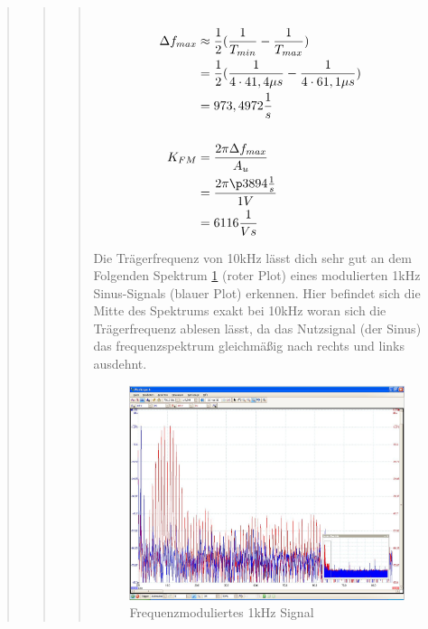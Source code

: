 \begin{quote}
\begin{quote}
\begin{quote}
            
            \begin{equation*}
            \begin{split}
            \\
                \Delta f_{max} &\approx \frac{1}{2} (\frac{1}{T_{min}} - \frac{1}{T_{max}})\\
                               &= \frac{1}{2} (\frac{1}{4\cdot41,4 \mu s}
                               -\frac{1}{4\cdot61,1 \mu s})\\
                               &= 973,4972 \frac{1}{s}\\
            \\
                K_{FM} &=\frac{2 \pi \Delta f_{max}}{A_u}\\
                       &= \frac{2 \pi \p 3894 \frac{1}{s}}{1V}\\
                       &=   6116 \frac{1}{Vs}
            \\
            \end{split}
            \end{equation*}
            \label{equ:}
            
            Die Trägerfrequenz von \si{10}{kHz} lässt dich sehr gut an dem Folgenden Spektrum \ref{fig:freq_1k} (roter Plot)
            eines modulierten \si{1}{kHz} Sinus-Signals (blauer Plot) erkennen. Hier befindet sich die Mitte des Spektrums exakt bei
            \si{10}{kHz} woran sich die Trägerfrequenz ablesen lässt, da das Nutzsignal (der Sinus) das frequenzspektrum
            gleichmäßig nach rechts und links ausdehnt.
            
            \begin{figure}[H]
            \centering
                \includegraphics[scale=0.5, trim = 0.25cm 1.3cm 1cm 3.2cm, clip]{Bilder/freq_1k}
                    \caption{Frequenzmoduliertes 1kHz Signal}
                    \label{fig:freq_1k}
            \end{figure}
            

\end{quote}
\end{quote}
\end{quote}
